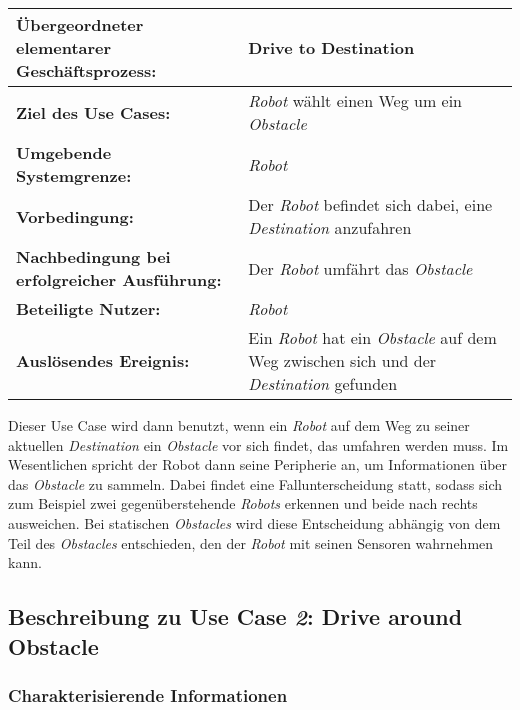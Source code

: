 			\begin{table}[H]
				\centering
				\begin{tabularx}{\textwidth}{@{}p{5cm}X@{}}
				\hline
				\textbf{Übergeordneter elementarer Geschäftsprozess:} & Drive to Destination\\ \hline
				\textbf{Ziel des Use Cases:} & \emph{Robot} wählt einen Weg um ein \emph{Obstacle} \\ \hline
				\textbf{Umgebende Systemgrenze:} & \emph{Robot} \\ \hline
				\textbf{Vorbedingung:} & Der \emph{Robot} befindet sich dabei, eine \emph{Destination} anzufahren \\ \hline
				\textbf{Nachbedingung bei erfolgreicher Ausführung:} & 
				Der \emph{Robot} umfährt das \emph{Obstacle} \\ \hline
				\textbf{Beteiligte Nutzer:} & \emph{Robot} \\ \hline
				\textbf{Auslösendes Ereignis:} & Ein \emph{Robot} hat ein \emph{Obstacle} auf dem Weg zwischen sich und der \emph{Destination} gefunden\\ \hline
				\end{tabularx}
			\end{table}

			Dieser Use Case wird dann benutzt, wenn ein \emph{Robot} auf dem Weg zu seiner aktuellen \emph{Destination} ein \emph{Obstacle} vor sich findet, das umfahren werden muss. Im Wesentlichen spricht der Robot dann seine Peripherie an, um Informationen über das \emph{Obstacle} zu sammeln. Dabei findet eine Fallunterscheidung statt, sodass sich zum Beispiel zwei gegenüberstehende \emph{Robots} erkennen und beide nach rechts ausweichen. Bei statischen \emph{Obstacles} wird diese Entscheidung abhängig von dem Teil des \emph{Obstacles} entschieden, den der \emph{Robot} mit seinen Sensoren wahrnehmen kann.
		
		\pagebreak
		
		
		\subsection{Beschreibung zu Use Case \emph{2}: Drive around Obstacle}

			\subsubsection*{Charakterisierende Informationen}

